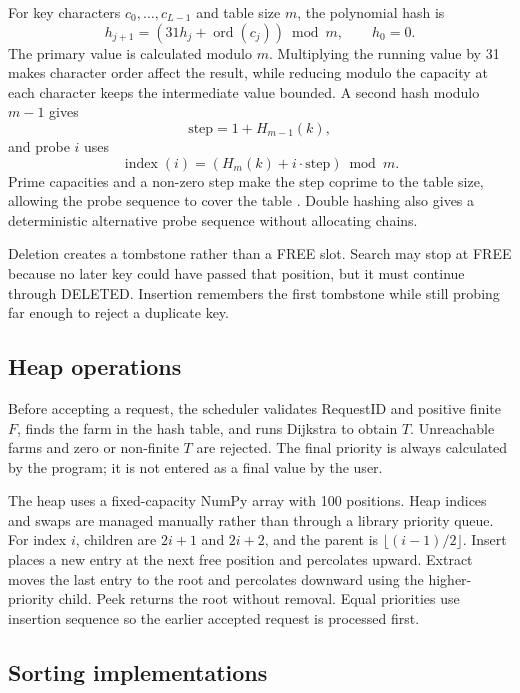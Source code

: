 \documentclass[10pt,a4paper]{article}
\begin{document}
For key characters $c_0,\ldots,c_{L-1}$ and table size $m$, the polynomial hash is
\begin{equation}
h_{j+1}=(31h_j+\operatorname{ord}(c_j))\bmod m,\qquad h_0=0.
\end{equation}
The primary value is calculated modulo $m$. Multiplying the running value by 31 makes character order affect the result, while reducing modulo the capacity at each character keeps the intermediate value bounded. A second hash modulo $m-1$ gives
\[
\text{step}=1+H_{m-1}(k),
\]
and probe $i$ uses
\begin{equation}
\operatorname{index}(i)=\left(H_m(k)+i\cdot\text{step}\right)\bmod m.
\end{equation}
Prime capacities and a non-zero step make the step coprime to the table size, allowing the probe sequence to cover the table \cite{clrs2022}. Double hashing also gives a deterministic alternative probe sequence without allocating chains.

Deletion creates a tombstone rather than a FREE slot. Search may stop at FREE because no later key could have passed that position, but it must continue through DELETED. Insertion remembers the first tombstone while still probing far enough to reject a duplicate key.

\subsection{Heap operations}
\label{sec:heap}

Before accepting a request, the scheduler validates RequestID and positive finite $F$, finds the farm in the hash table, and runs Dijkstra to obtain $T$. Unreachable farms and zero or non-finite $T$ are rejected. The final priority is always calculated by the program; it is not entered as a final value by the user.

The heap uses a fixed-capacity NumPy array with 100 positions. Heap indices and swaps are managed manually rather than through a library priority queue. For index $i$, children are $2i+1$ and $2i+2$, and the parent is $\lfloor(i-1)/2\rfloor$. Insert places a new entry at the next free position and percolates upward. Extract moves the last entry to the root and percolates downward using the higher-priority child. Peek returns the root without removal. Equal priorities use insertion sequence so the earlier accepted request is processed first.

\subsection{Sorting implementations}
\label{sec:sorting}
\end{document}
